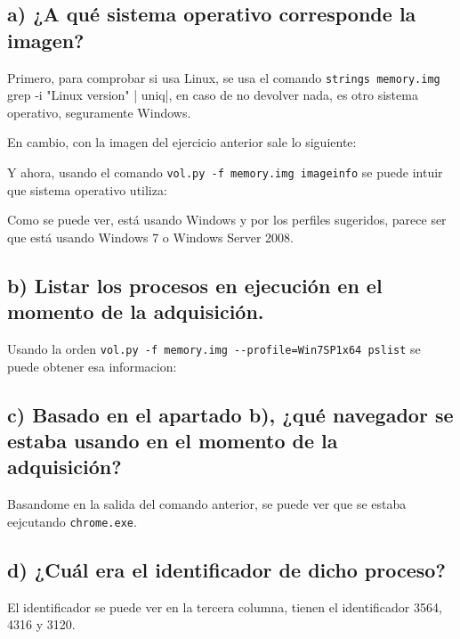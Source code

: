 \documentclass{article}
\begin{document}
\subsection{a) ¿A qué sistema operativo corresponde la imagen?}

Primero, para comprobar si usa Linux, se usa el comando \verb|strings memory.img | grep -i "Linux version" | uniq|, en caso de no devolver nada, es otro sistema operativo, seguramente Windows.


En cambio, con la imagen del ejercicio anterior sale lo siguiente:



Y ahora, usando el comando \verb|vol.py -f memory.img imageinfo| se puede intuir que sistema operativo utiliza:


Como se puede ver, está usando Windows y por los perfiles sugeridos, parece ser que está usando Windows 7 o Windows Server 2008.

\subsection{b) Listar los procesos en ejecución en el momento de la adquisición.}

Usando la orden \verb|vol.py -f memory.img --profile=Win7SP1x64 pslist| se puede obtener esa informacion:


\subsection{c) Basado en el apartado b), ¿qué navegador se estaba usando en el momento de la adquisición?}

Basandome en la salida del comando anterior, se puede ver que se estaba eejcutando \verb|chrome.exe|.


\subsection{d) ¿Cuál era el identificador de dicho proceso?}

El identificador se puede ver en la tercera columna, tienen el identificador 3564, 4316 y 3120.
\end{document}
